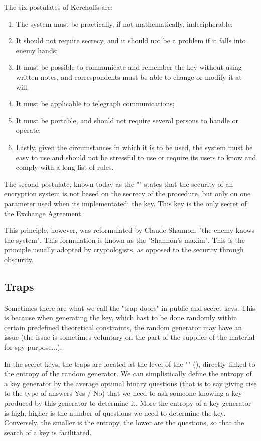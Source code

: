 	The six postulates of Kerchoffs are:
	\begin{enumerate}
		\item The system must be practically, if not mathematically, indecipherable;
		\item It should not require secrecy, and it should not be a problem if it falls into enemy hands;
		\item It must be possible to communicate and remember the key without using written notes, and correspondents must be able to change or modify it at will;
		\item It must be applicable to telegraph communications;
		\item It must be portable, and should not require several persons to handle or operate;
		\item Lastly, given the circumstances in which it is to be used, the system must be easy to use and should not be stressful to use or require its users to know and comply with a long list of rules.
	\end{enumerate}
	The second postulate, known today as the ""  states that the security of an encryption system is not based on the secrecy of the procedure, but only on one parameter used when its implementated: the key. This key is the only secret of the Exchange Agreement.
	
	This principle, however, was reformulated by Claude Shannon: "the enemy knows the system". This formulation is known as the "Shannon's maxim". This is the principle usually adopted by cryptologists, as opposed to the security through obscurity.
	
	\subsection{Traps}
	Sometimes there are what we call the "trap doors" in public and secret keys. This is because when generating the key, which hast to be done randomly within certain predefined theoretical constraints, the random generator may have an issue (the issue is sometimes voluntary on the part of the supplier of the material for spy purpose...).
	
	In the secret keys, the traps are located at the level of the "" (), directly linked to the entropy of the random generator. We can simplistically define the entropy of a key generator by the average optimal binary questions (that is to say giving rise to the type of answers Yes / No) that we need to ask someone knowing a key produced by this generator to determine it. More the entropy of a key generator is high, higher is the number of questions we need to determine the key. Conversely, the smaller is the entropy, the lower are the questions, so that the search of a key is facilitated.
	
